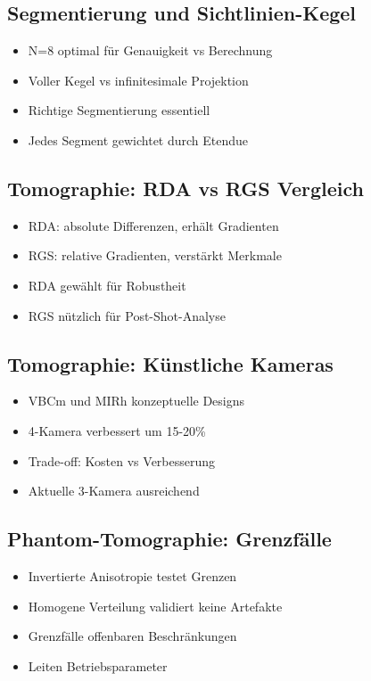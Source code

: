 \documentclass[11pt,a4paper]{article}
\begin{document}
\subsection{Segmentierung und Sichtlinien-Kegel}

\begin{itemize}
\item N=8 optimal für Genauigkeit vs Berechnung
\item Voller Kegel vs infinitesimale Projektion
\item Richtige Segmentierung essentiell
\item Jedes Segment gewichtet durch Etendue
\end{itemize}

\subsection{Tomographie: RDA vs RGS Vergleich}

\begin{itemize}
\item RDA: absolute Differenzen, erhält Gradienten
\item RGS: relative Gradienten, verstärkt Merkmale
\item RDA gewählt für Robustheit
\item RGS nützlich für Post-Shot-Analyse
\end{itemize}

\subsection{Tomographie: Künstliche Kameras}

\begin{itemize}
\item VBCm und MIRh konzeptuelle Designs
\item 4-Kamera verbessert um 15-20\%
\item Trade-off: Kosten vs Verbesserung
\item Aktuelle 3-Kamera ausreichend
\end{itemize}

\subsection{Phantom-Tomographie: Grenzfälle}

\begin{itemize}
\item Invertierte Anisotropie testet Grenzen
\item Homogene Verteilung validiert keine Artefakte
\item Grenzfälle offenbaren Beschränkungen
\item Leiten Betriebsparameter
\end{itemize}
\end{document}
